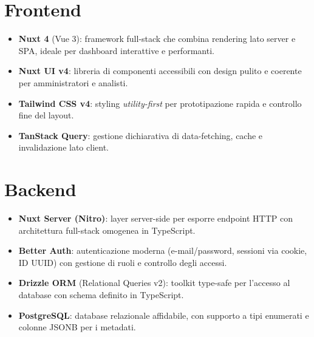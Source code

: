 \documentclass[12pt,a4paper,oneside]{report}
\begin{document}
\section{Frontend}
\begin{itemize}[nosep]
  \item \textbf{Nuxt 4} (Vue 3): framework full-stack che combina rendering lato server e
        SPA, ideale per dashboard interattive e performanti.
  \item \textbf{Nuxt UI v4}: libreria di componenti accessibili con design pulito e coerente
        per amministratori e analisti.
  \item \textbf{Tailwind CSS v4}: styling \emph{utility-first} per prototipazione rapida e
        controllo fine del layout.
  \item \textbf{TanStack Query}: gestione dichiarativa di data-fetching, cache e
        invalidazione lato client.
\end{itemize}

\section{Backend}
\begin{itemize}[nosep]
  \item \textbf{Nuxt Server (Nitro)}: layer server-side per esporre endpoint HTTP con
        architettura full-stack omogenea in TypeScript.
  \item \textbf{Better Auth}: autenticazione moderna (e-mail/password, sessioni via cookie,
        ID UUID) con gestione di ruoli e controllo degli accessi.
  \item \textbf{Drizzle ORM} (Relational Queries v2): toolkit type-safe per l'accesso al
        database con schema definito in TypeScript.
  \item \textbf{PostgreSQL}: database relazionale affidabile, con supporto a tipi enumerati
        e colonne JSONB per i metadati.
\end{itemize}
\end{document}
